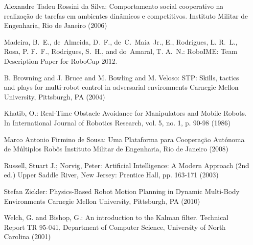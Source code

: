 \documentclass{llncs}
\begin{document}
\begin{thebibliography}{7}

Alexandre Tadeu Rossini da Silva:
Comportamento social cooperativo na realização de tarefas em
ambientes dinâmicos e competitivos.
Instituto Militar de Engenharia, Rio de Janeiro (2006)

Madeira, B.~E., de~Almeida, D.~F., de~C.~Maia~Jr., E., Rodrigues, L. R.~L.,
  Rosa, P. F.~F., Rodrigues, S.~H., and do~Amaral, T. A.~N.:
RoboIME: Team Description Paper for RoboCup 2012.

B. Browning and J. Bruce and M. Bowling and M. Veloso:
STP: Skills, tactics and plays for multi-robot control in adversarial environments
Carnegie Mellon University, Pittsburgh, PA (2004)

Khatib, O.:
Real-Time Obstacle Avoidance for Manipulators and Mobile Robots.
In International Journal of Robotics Research, vol. 5, no. 1, p. 90-98 (1986)

Marco Antonio Firmino de Sousa:
Uma Plataforma para Cooperação Autónoma de Múltiplos Robôs
Instituto Militar de Engenharia, Rio de Janeiro (2008)

 Russell, Stuart J.; Norvig, Peter:
Artificial Intelligence: A Modern Approach (2nd ed.)
Upper Saddle River, New Jersey: Prentice Hall, pp. 163-171 (2003)

Stefan Zickler:
Physics-Based Robot Motion Planning in Dynamic Multi-Body Environments
Carnegie Mellon University, Pittsburgh, PA (2010)

Welch, G. and Bishop, G.:
An introduction to the Kalman filter. Technical Report TR 95-041, Department of
Computer Science, University of North Carolina (2001)




\end{thebibliography}
\end{document}
